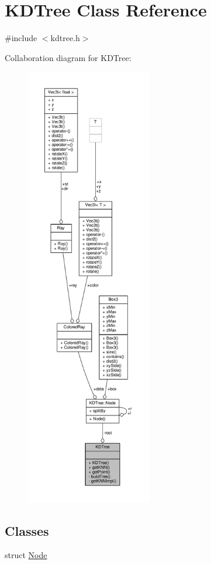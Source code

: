 \hypertarget{classKDTree}{}\section{K\+D\+Tree Class Reference}
\label{classKDTree}


{\ttfamily \#include $<$kdtree.\+h$>$}



Collaboration diagram for K\+D\+Tree\+:
\nopagebreak
\begin{figure}[H]
\begin{center}
\leavevmode
\includegraphics[height=550pt]{classKDTree__coll__graph}
\end{center}
\end{figure}
\subsection*{Classes}
\begin{DoxyCompactItemize}
\item 
struct \hyperlink{structKDTree_1_1Node}{Node}
\end{DoxyCompactItemize}
